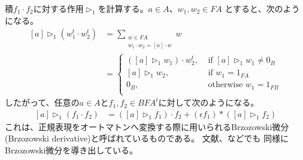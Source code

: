 	積$f_1\cdot f_2$に対する作用$\rhd_1$を計算する。$a\in A$、$w_1,w_2\in FA$
	とすると、次のようになる。
	\begin{equation*}\begin{split} %
		[a]\rhd_1 (w_1^t\cdot w_2^t) &= \sum_{\substack{w\in FA\\w_1\cdot w_2=[a]\cdot w}}w \\
			&= \begin{cases}
				([a]\rhd_1 w_1)\cdot w_2^t, &\text{ if } [a]\rhd_1 w_1 \neq 0_B \\
				[a]\rhd_1 w_2, &\text{ if } w_1 = 1_{FA} \\
				0_B, &\text{ otherwise } w_1 = 1_{FB} \\
			\end{cases}
	\end{split}\end{equation*} %
	したがって、任意の$a\in A$と$f_1,f_2\in BFA^t$に対して次のようになる。
	\begin{equation*}\begin{split} %
		[a]\rhd_1(f_1\cdot f_2) &= ([a]\rhd_1 f_1)\cdot f_2 + (\epsilon f_1)*([a]\rhd_1 f_2)
	\end{split}\end{equation*} %
	これは、正規表現をオートマトンへ変換する際に用いられるBrzozowski微分
	(Brzozowski derivative)と呼ばれているものである。
	文献\cite{arxiv:worthing:bialgebra}、\cite{url:jacobs:bialgebra}などでも
	同様にBrzozowski微分を導き出している。
